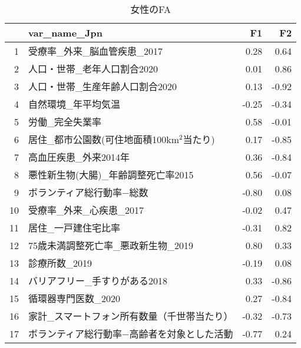 \begin{table}[ht]
\centering
\begingroup\tiny
\begin{tabular}{rlrr}
  \hline
 & var\_name\_Jpn & F1 & F2 \\ 
  \hline
1 & 受療率\_外来\_脳血管疾患\_2017 & 0.28 & 0.64 \\ 
  2 & 人口・世帯\_老年人口割合2020 & 0.01 & 0.86 \\ 
  3 & 人口・世帯\_生産年齢人口割合2020 & 0.13 & -0.92 \\ 
  4 & 自然環境\_年平均気温 & -0.25 & -0.34 \\ 
  5 & 労働\_完全失業率 & 0.58 & -0.01 \\ 
  6 & 居住\_都市公園数(可住地面積100km$^2$当たり) & 0.17 & -0.85 \\ 
  7 & 高血圧疾患\_外来2014年 & 0.36 & -0.84 \\ 
  8 & 悪性新生物(大腸)\_年齢調整死亡率2015 & 0.56 & -0.07 \\ 
  9 & ボランティア総行動率−総数 & -0.80 & 0.08 \\ 
  10 & 受療率\_外来\_心疾患\_2017 & -0.02 & 0.47 \\ 
  11 & 居住\_一戸建住宅比率 & -0.31 & 0.82 \\ 
  12 & 75歳未満調整死亡率\_悪政新生物\_2019 & 0.80 & 0.33 \\ 
  13 & 診療所数\_2019 & -0.19 & 0.08 \\ 
  14 & バリアフリー\_手すりがある2018 & 0.33 & -0.86 \\ 
  15 & 循環器専門医数\_2020 & 0.27 & -0.84 \\ 
  16 & 家計\_スマートフォン所有数量（千世帯当たり） & -0.32 & -0.73 \\ 
  17 & ボランティア総行動率−高齢者を対象とした活動 & -0.77 & 0.24 \\ 
   \hline
\end{tabular}
\endgroup
\caption{女性のFA} 
\label{FAf}
\end{table}
